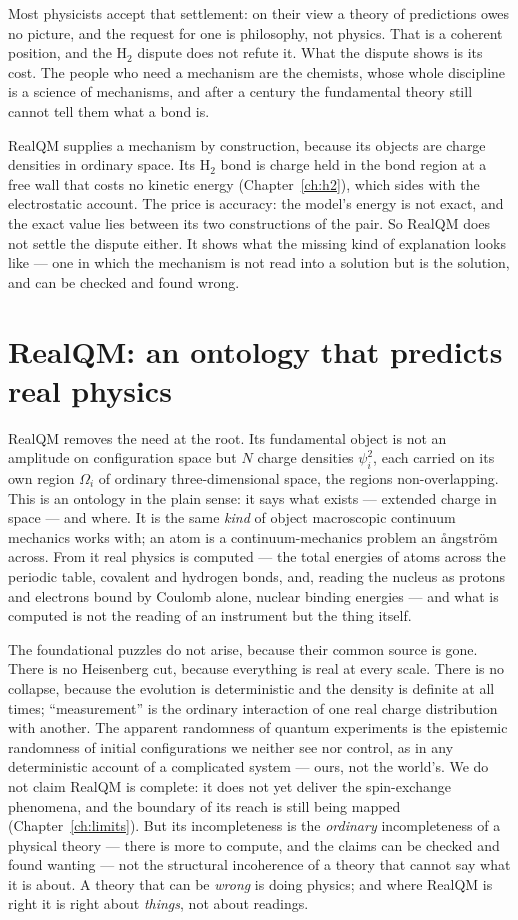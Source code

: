 Most physicists accept that settlement: on their view a theory of predictions owes no picture, and the
request for one is philosophy, not physics. That is a coherent position, and the H$_2$ dispute does not
refute it. What the dispute shows is its cost. The people who need a mechanism are the chemists, whose
whole discipline is a science of mechanisms, and after a century the fundamental theory still cannot tell
them what a bond is.

RealQM supplies a mechanism by construction, because its objects are charge densities in ordinary space.
Its H$_2$ bond is charge held in the bond region at a free wall that costs no kinetic energy
(Chapter~\ref{ch:h2}), which sides with the electrostatic account. The price is accuracy: the model's
energy is not exact, and the exact value lies between its two constructions of the pair. So RealQM does
not settle the dispute either. It shows what the missing kind of explanation looks like --- one in which
the mechanism is not read into a solution but is the solution, and can be checked and found wrong.

\section{RealQM: an ontology that predicts real physics}\label{sec:realqm-ontology}

RealQM removes the need at the root. Its fundamental object is not an amplitude on configuration space but $N$
charge densities $\psi_i^2$, each carried on its own region $\Omega_i$ of ordinary three-dimensional space, the
regions non-overlapping. This is an ontology in the plain sense: it says what exists --- extended charge in
space --- and where. It is the same \emph{kind} of object macroscopic continuum mechanics works with; an atom is
a continuum-mechanics problem an \aa ngstr\"om across. From it real physics is computed --- the total energies of
atoms across the periodic table, covalent and hydrogen bonds, and, reading the nucleus as protons and electrons
bound by Coulomb alone, nuclear binding energies --- and what is computed is not the reading of an instrument but
the thing itself.

The foundational puzzles do not arise, because their common source is gone. There is no Heisenberg cut, because
everything is real at every scale. There is no collapse, because the evolution is deterministic and the density
is definite at all times; ``measurement'' is the ordinary interaction of one real charge distribution with
another. The apparent randomness of quantum experiments is the epistemic randomness of initial configurations we
neither see nor control, as in any deterministic account of a complicated system --- ours, not the world's. We do
not claim RealQM is complete: it does not yet deliver the spin-exchange phenomena, and the boundary of its reach
is still being mapped (Chapter~\ref{ch:limits}). But its incompleteness is the \emph{ordinary} incompleteness of
a physical theory --- there is more to compute, and the claims can be checked and found wanting --- not the
structural incoherence of a theory that cannot say what it is about. A theory that can be \emph{wrong} is doing
physics; and where RealQM is right it is right about \emph{things}, not about readings.

